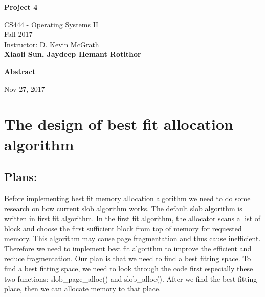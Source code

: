 \documentclass[10pt,letterpaper]{article}
\begin{document}
\begin{titlepage}
\begin{center}
    \Huge
    \textbf{Project 4}
    
    \vspace{0.5in}
    \large
    CS444 - Operating Systems II\\
    
    \vspace{0.2in}
    \large
    Fall 2017\\
    
    \vspace{0.2in}
    \large
    Instructor: D. Kevin McGrath\\
    
    \vspace{0.2in}
    \textbf{Xiaoli Sun, Jaydeep Hemant Rotithor}
    
    \vspace{0.5in}
    \textbf{Abstract}\\
    \vspace{0.2in}
    
    
    \vspace{0.3in}
    \vfill
    
    Nov 27, 2017

\end{center}
\end{titlepage}




\newpage
\section{The design of best fit allocation algorithm}
\subsection{Plans:}
Before implementing best fit memory allocation algorithm we need to do some research on how current slob algorithm works. The default slob algorithm is written in first fit algorithm. In the first fit algorithm, the allocator scans a list of block and choose the first sufficient block from top of memory for requested memory. This algorithm may cause page fragmentation and thus cause inefficient. Therefore we need to implement best fit algorithm to improve the efficient and reduce fragmentation. 
Our plan is that we need to find a best fitting space. To find a best fitting space, we need to look through the code first especially these two functions: slob\_page\_alloc() and slob\_alloc(). After we find the best fitting place, then we can allocate memory to that place. 
\end{document}
